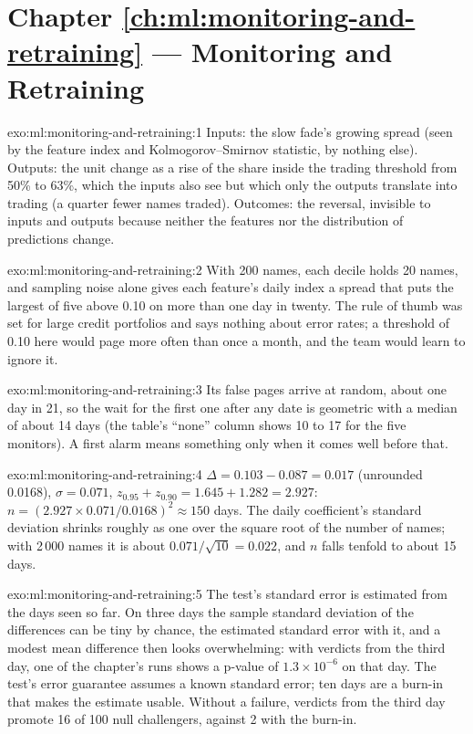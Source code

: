 \section*{Chapter \ref{ch:ml:monitoring-and-retraining} --- Monitoring and Retraining}

\begin{solution}{exo:ml:monitoring-and-retraining:1}
Inputs: the slow fade's growing spread (seen by the feature index and Kolmogorov--Smirnov statistic, by nothing else). Outputs:
the unit change as a rise of the share inside the trading threshold from 50\% to 63\%, which the inputs also see but which only
the outputs translate into trading (a quarter fewer names traded). Outcomes: the reversal, invisible to inputs and outputs because
neither the features nor the distribution of predictions change.
\end{solution}

\begin{solution}{exo:ml:monitoring-and-retraining:2}
With 200 names, each decile holds 20 names, and sampling noise alone gives each feature's daily index a spread that puts the
largest of five above 0.10 on more than one day in twenty. The rule of thumb was set for large credit portfolios and says nothing
about error rates; a threshold of 0.10 here would page more often than once a month, and the team would learn to ignore it.
\end{solution}

\begin{solution}{exo:ml:monitoring-and-retraining:3}
Its false pages arrive at random, about one day in 21, so the wait for the first one after any date is geometric with a median of
about 14 days (the table's ``none'' column shows 10 to 17 for the five monitors). A first alarm means something only when it
comes well before that.
\end{solution}

\begin{solution}{exo:ml:monitoring-and-retraining:4}
$\Delta=0.103-0.087=0.017$ (unrounded 0.0168), $\sigma=0.071$, $z_{0.95}+z_{0.90}=1.645+1.282=2.927$: $n=(2.927\times0.071/0.0168)^2
\approx150$ days. The daily coefficient's standard deviation shrinks roughly as one over the square root of the number of names;
with 2\,000 names it is about $0.071/\sqrt{10}=0.022$, and $n$ falls tenfold to about 15 days.
\end{solution}

\begin{solution}{exo:ml:monitoring-and-retraining:5}
The test's standard error is estimated from the days seen so far. On three days the sample standard deviation of the differences
can be tiny by chance, the estimated standard error with it, and a modest mean difference then looks overwhelming: with verdicts
from the third day, one of the chapter's runs shows a p-value of $1.3\times10^{-6}$ on that day. The test's error guarantee
assumes a known standard error; ten days are a burn-in that makes the estimate usable. Without a failure, verdicts from the third
day promote 16 of 100 null challengers, against 2 with the burn-in.
\end{solution}

